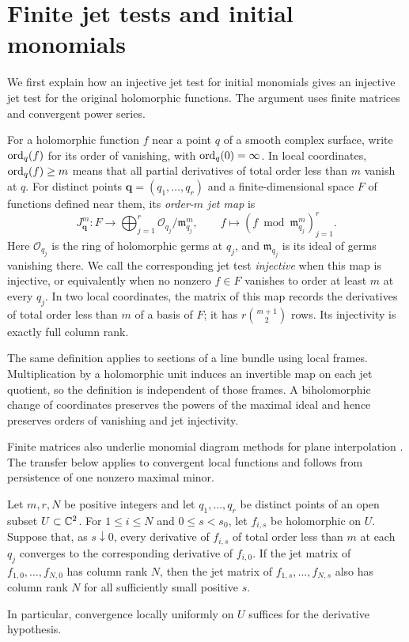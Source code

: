 \section{Finite jet tests and initial monomials}\label{sec:jets}

We first explain how an injective jet test for initial monomials gives an
injective jet test for the original holomorphic functions.  The argument
uses finite matrices and convergent power series.

For a holomorphic function $f$ near a point $q$ of a smooth complex surface,
write $\operatorname{ord}_q(f)$ for its order of vanishing, with $\operatorname{ord}_q(0)=\infty$.
In local coordinates, $\operatorname{ord}_q(f)\ge m$ means that all partial derivatives of
total order less than $m$ vanish at $q$.  For distinct points
$\boldsymbol q=(q_1,\ldots,q_r)$ and a finite-dimensional space $F$ of
functions defined near them, its \emph{order-$m$ jet map} is
\[
 J^m_{\boldsymbol q}\colon F\longrightarrow
 \bigoplus_{j=1}^r\mathcal O_{q_j}/\mathfrak m_{q_j}^{m},
 \qquad f\longmapsto (f\bmod\mathfrak m_{q_j}^{m})_{j=1}^r.
\]
Here $\mathcal O_{q_j}$ is the ring of holomorphic germs at $q_j$, and
$\mathfrak m_{q_j}$ is its ideal of germs vanishing there.  We call the
corresponding jet test \emph{injective} when this map is injective, or
equivalently when no nonzero $f\in F$ vanishes to order at least $m$ at
every $q_j$.  In two local coordinates, the matrix of this map records
the derivatives of total order less than $m$ of a basis of $F$; it has
$r\binom{m+1}{2}$ rows.  Its injectivity is exactly full column rank.

The same definition applies to sections of a line bundle using local
frames.  Multiplication by a holomorphic unit induces an invertible map
on each jet quotient, so the definition is independent of those frames.
A biholomorphic change of coordinates preserves the powers of the
maximal ideal and hence preserves orders of vanishing and jet
injectivity.

Finite matrices also underlie monomial diagram methods for plane
interpolation \cite[Propositions~10 and~13]{Dumnicki2007}. The transfer
below applies to convergent local functions and follows from persistence
of one nonzero maximal minor.

\begin{lemma}\label{lem:rank-persistence}
Let $m,r,N$ be positive integers and let $q_1,\ldots,q_r$ be distinct
points of an open subset $U\subset\mathbb C^2$.  For $1\le i\le N$ and
$0\le s<s_0$, let $f_{i,s}$ be holomorphic on $U$.  Suppose that, as
$s\downarrow0$, every derivative of $f_{i,s}$ of total order less than
$m$ at each $q_j$ converges to the corresponding derivative of $f_{i,0}$.
If the jet matrix of $f_{1,0},\ldots,f_{N,0}$ has column rank $N$, then
the jet matrix of $f_{1,s},\ldots,f_{N,s}$ also has column rank $N$ for
all sufficiently small positive $s$.

In particular, convergence locally uniformly on $U$ suffices for the
derivative hypothesis.
\end{lemma}

